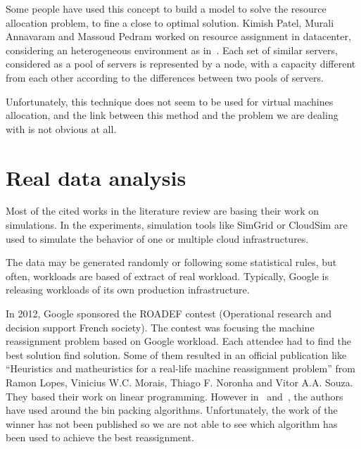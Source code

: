 Some people have used this concept to build a model to solve the resource
allocation problem, to fine a close to optimal solution. Kimish Patel, Murali
Annavaram and Massoud Pedram worked on resource assignment in
datacenter\cite{allocationNetworkflow}, considering an heterogeneous
environment as in~\cite{allocationHeterogeneous}. Each set of similar servers,
considered as a pool of servers is represented by a node, with a capacity
different from each other according to the differences between two pools of
servers.

Unfortunately, this technique does not seem to be used for virtual machines
allocation, and the link between this method and the problem we are dealing
with is not obvious at all.

\section{Real data analysis}

Most of the cited works in the literature review are basing their work on
simulations.  In the experiments, simulation tools like
SimGrid\cite{websiteSimgrid} or CloudSim\cite{websiteCloudsim} are used to simulate
the behavior of one or multiple cloud infrastructures.

The data may be generated randomly or following some statistical rules, but
often, workloads are based of extract of real workload. Typically, Google is
releasing workloads of its own production infrastructure. 

In 2012, Google sponsored the ROADEF contest (Operational research and decision
support French society)\cite{websiteRoadef}. The contest was focusing the machine
reassignment problem based on Google workload. Each attendee had to find the
best solution find solution. Some of them resulted in an official publication
like “Heuristics and matheuristics for a real-life machine reassignment
problem” from Ramon Lopes, Vinicius W.C. Morais, Thiago F. Noronha and Vitor
A.A. Souza\cite{roadefIp}.  They based their work on linear programming.
However in~\cite{roadefBp1} and~\cite{roadefBp2}, the authors have used
around the bin packing algorithms. Unfortunately, the work of the winner has
not been published so we are not able to see which algorithm has been used to
achieve the best reassignment.
